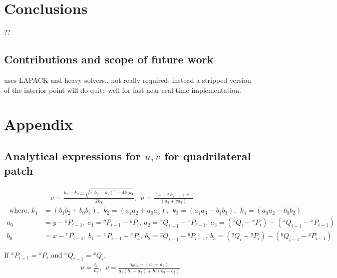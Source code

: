 \documentclass[12pt,a4]{article}
\begin{document}
\section{Conclusions}

??


\subsection{Contributions and scope of future work}
uses LAPACK and heavy solvers.. not really required. instead a stripped version of the interior point will do quite well for fast near real-time implementation. 

\section{Appendix}	
\subsection{Analytical expressions for $u,v$ for quadrilateral patch}\label{app:Analylit_u_v_quad}
\begin{align}
&\quad {v} = \frac{k_1-k_2\pm \sqrt{\left(k_2-k_1\right)^2-4k_3k_4}}{2k_3},~~{u} = \frac{\left(x-{}^xP_{i-1}+{v}\right)}{\left( a_2+{v} a_3 \right)}\\
\nonumber\text{ where, }k_1 &= \left(b_1b_2+b_0b_3 \right),~~k_2 = \left(a_1a_2+a_0a_3 \right),~~
k_3 = \left(a_1a_3-b_1b_3 \right),~~k_4=\left(a_0a_2-b_0b_2 \right)\\
\nonumber a_0 &= y-{}^yP_{i-1},~a_1 = {}^yP_{i-1}-{}^yP_i,~a_2 = {}^xQ_{i-1}-{}^xP_{i-1},~a_3 = \left({}^xQ_{i}-{}^xP_i\right)-\left({}^xQ_{i-1}-{}^xP_{i-1}\right)\\
\nonumber b_0 &= x-{}^xP_{i-1},~b_1 = {}^xP_{i-1}-{}^xP_i,~b_2 = {}^yQ_{i-1}-{}^yP_{i-1},~b_3 = \left({}^yQ_{i}-{}^yP_i\right)-\left({}^yQ_{i-1}-{}^yP_{i-1}\right)
\end{align}

If ${}^xP_{i-1}={}^xP_{i}$ and ${}^xQ_{i-1}={}^xQ_{i}$, 
\begin{align}
{u} = \frac{b_0}{a_2},~~{v} = \frac{a_0a_2-\left(a_3+a_2 \right)}{a_1\left(b_0-a_2\right)+b_0\left(b_3-b_2 \right)}
\end{align}
\end{document}
